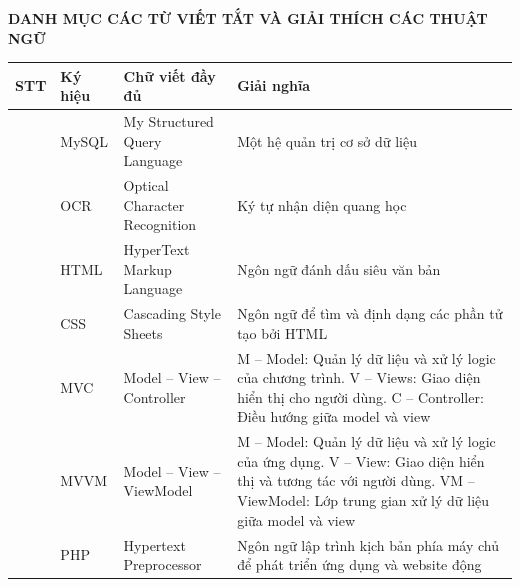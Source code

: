 \begin{center}
	{\bfseries\fontsize{15}{18}\selectfont DANH MỤC CÁC TỪ VIẾT TẮT VÀ GIẢI THÍCH CÁC THUẬT NGỮ}
\end{center}

\vspace{0.3cm}

\begin{table}[H]
	\centering
	\renewcommand{\arraystretch}{1.25}
	\begin{tabular}{|>{\centering\arraybackslash}p{1cm}|
			>{\centering\arraybackslash}p{2cm}|
			>{\raggedright\arraybackslash}p{4.2cm}|
			>{\raggedright\arraybackslash}p{6.2cm}|}
		\hline
		\textbf{STT} & \textbf{Ký hiệu} & \textbf{Chữ viết đầy đủ} & \textbf{Giải nghĩa} \\
		\hline
		1 & MySQL & My Structured Query Language & Một hệ quản trị cơ sở dữ liệu \\
		\hline
		2 & OCR & Optical Character Recognition & Ký tự nhận diện quang học \\
		\hline
		3 & HTML & HyperText Markup Language & Ngôn ngữ đánh dấu siêu văn bản \\
		\hline
		4 & CSS & Cascading Style Sheets & Ngôn ngữ để tìm và định dạng các phần tử tạo bởi HTML \\
		\hline
		5 & MVC & Model -- View -- Controller & M -- Model: Quản lý dữ liệu và xử lý logic của chương trình. V -- Views: Giao diện hiển thị cho người dùng. C -- Controller: Điều hướng giữa model và view \\
		\hline
		6 & MVVM & Model -- View -- ViewModel & M -- Model: Quản lý dữ liệu và xử lý logic của ứng dụng. V -- View: Giao diện hiển thị và tương tác với người dùng. VM -- ViewModel: Lớp trung gian xử lý dữ liệu giữa model và view \\
		\hline
		7 & PHP & Hypertext Preprocessor & Ngôn ngữ lập trình kịch bản phía máy chủ để phát triển ứng dụng và website động \\
		\hline
	\end{tabular}
\end{table}